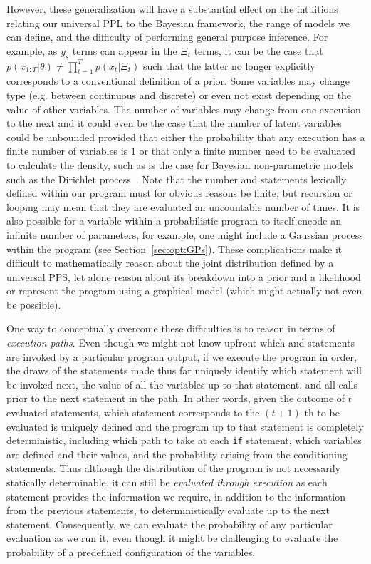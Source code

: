 However, these generalization will have a substantial effect on the intuitions relating our universal
PPL to the Bayesian framework, the range of models we can define, and the difficulty of performing
general purpose inference.  For example, as $y_s$ terms can appear in the $\Xi_t$ terms,
it can be the case that $p(x_{1:T} | \theta) \neq \prod_{t=1}^{T} p(x_t | \Xi_t)$ such that the latter no
longer explicitly corresponds to a conventional definition of a prior.  Some variables may change type (e.g.
between continuous and discrete) or even not exist depending on the value of other variables.  The number
of variables may change from one execution to the next and it could even be the case that the number
of latent variables could be unbounded provided that either the probability that any execution has a 
finite number of variables is $1$ or that only a finite number need to be evaluated to calculate the density, such
as is the case for Bayesian non-parametric models such as the Dirichlet process~\citep{ferguson1973bayesian,teh2011dirichlet}.
Note that the number \sample and \observe statements lexically defined within our program must
for obvious reasons be finite, but recursion or looping may mean that they are evaluated an uncountable
number of times.  It is also possible for a variable within a probabilistic program to itself encode an
infinite number of parameters, for example, one might include a Gaussian process within the program (see Section~\ref{sec:opt:GPs}).
These complications make it difficult to mathematically reason about the joint distribution defined by a
universal PPS, let alone reason about its breakdown into a prior and a likelihood or represent the program
using a graphical model (which might actually not even be possible).

One way to conceptually overcome these difficulties is to reason in terms of \emph{execution paths}.
Even though we might not know upfront which \sample and \observe statements are invoked by
a particular program output, if we execute the program in order, the draws of the \sample statements made
thus far uniquely identify which \sample statement will be invoked next, the value of all the variables up
to that \sample statement, and all \observe calls prior to the next \sample statement in the path.  
In other words, given the outcome of $t$ evaluated \sample statements, which \sample statement corresponds
to the $(t+1)$-th to be evaluated is uniquely defined and the program up to that \sample statement is
completely deterministic, including which path to take at each \texttt{if} statement, which variables are defined
and their values, and the probability arising from the \observe conditioning statements.
Thus although the distribution of the program is not necessarily statically
determinable, it can still be \emph{evaluated through execution} as each \sample statement provides
the information we require, in addition to the information from the previous \sample statements, to deterministically evaluate
up to the next \sample statement.
Consequently, we can evaluate the probability of any particular evaluation as we run it, even though it might
be challenging to evaluate the probability of a predefined configuration of the variables.

